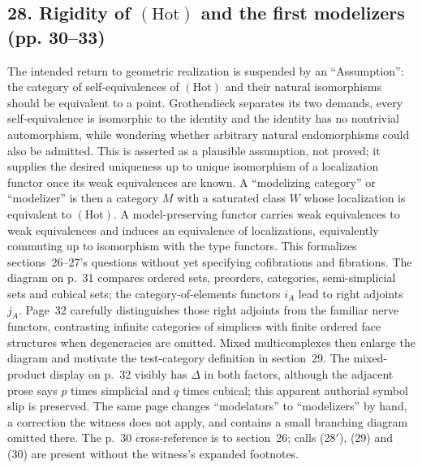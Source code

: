 \subsection*{28. Rigidity of $(\mathrm{Hot})$ and the first modelizers (pp. 30--33)}
The intended return to geometric realization is suspended by an ``Assumption'': the category of self-equivalences of $(\mathrm{Hot})$ and their natural isomorphisms should be equivalent to a point. Grothendieck separates its two demands, every self-equivalence is isomorphic to the identity and the identity has no nontrivial automorphism, while wondering whether arbitrary natural endomorphisms could also be admitted. This is asserted as a plausible assumption, not proved; it supplies the desired uniqueness up to unique isomorphism of a localization functor once its weak equivalences are known. A ``modelizing category'' or ``modelizer'' is then a category $M$ with a saturated class $W$ whose localization is equivalent to $(\mathrm{Hot})$. A model-preserving functor carries weak equivalences to weak equivalences and induces an equivalence of localizations, equivalently commuting up to isomorphism with the type functors. This formalizes sections~26--27's questions without yet specifying cofibrations and fibrations. The diagram on p.~31 compares ordered sets, preorders, categories, semi-simplicial sets and cubical sets; the category-of-elements functors $i_A$ lead to right adjoints $j_A$. Page~32 carefully distinguishes those right adjoints from the familiar nerve functors, contrasting infinite categories of simplices with finite ordered face structures when degeneracies are omitted. Mixed multicomplexes then enlarge the diagram and motivate the test-category definition in section~29. The mixed-product display on p.~32 visibly has $\Delta$ in both factors, although the adjacent prose says $p$ times simplicial and $q$ times cubical; this apparent authorial symbol slip is preserved. The same page changes ``modelators'' to ``modelizers'' by hand, a correction the witness does not apply, and contains a small branching diagram omitted there. The p.~30 cross-reference is to section~26; calls (28$'$), (29) and (30) are present without the witness's expanded footnotes.


